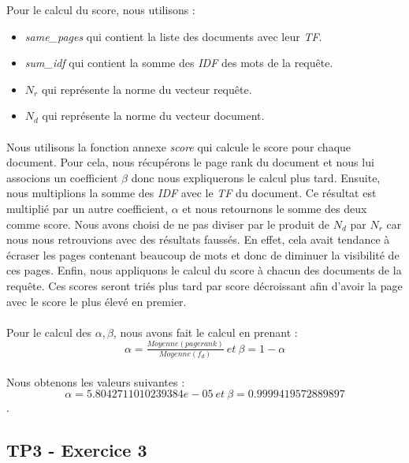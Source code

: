 \documentclass[10pt,a4paper]{article}
\begin{document}
Pour le calcul du score, nous utilisons :
\begin{itemize}
	\item \textit{same\_pages} qui contient la liste des documents avec leur \textit{TF}.
	\item \textit{sum\_idf} qui contient la somme des \textit{IDF} des mots de la requête.
	\item $N_r$ qui représente la norme du vecteur requête.
	\item $N_d$ qui représente la norme du vecteur document.
\end{itemize}
\paragraph{}Nous utilisons la fonction annexe  \textit{score} qui calcule le score pour chaque document. Pour cela, nous récupérons le page rank du document et nous lui associons un coefficient $\beta$ donc nous expliquerons le calcul plus tard. Ensuite, nous multiplions la somme des \textit{IDF} avec le \textit{TF} du document. Ce résultat est multiplié par un autre coefficient, $\alpha$ et nous retournons le somme des deux comme score. Nous avons choisi de ne pas diviser par le produit de $N_d$ par $N_r$ car nous nous retrouvions avec des résultats faussés. En effet, cela avait tendance à écraser les pages contenant beaucoup de mots et donc de diminuer la visibilité de ces pages. Enfin, nous appliquons le calcul du score à chacun des documents de la requête. Ces scores seront triés plus tard par score décroissant afin d'avoir la page avec le score le plus élevé en premier.
\paragraph{}Pour le calcul des $\alpha,\beta$, nous avons fait le calcul en prenant : $$\alpha = \tfrac{Moyenne(pagerank)}{Moyenne(f_d)}\ et\ \beta = 1 - \alpha$$
\paragraph{}Nous obtenons les valeurs suivantes : $$\alpha = 5.8042711010239384e-05\ et\ \beta  = 0.9999419572889897$$.

\subsection{TP3 - Exercice 3}
\end{document}
